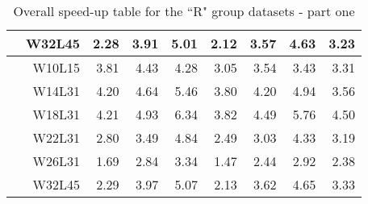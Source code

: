 \begin{table}[!ht]
\begin{tabular}{c r | rrr | rrrr}
		& W32L45 & 2.28 & 3.91 & 5.01 & 2.12 & 3.57 & 4.63 & 3.23 \\
		\midrule
		\multirow{6}{*}{\rotatebox[origin=c]{90}{\textbf{R500}}}
		& W10L15 & 3.81 & 4.43 & 4.28 & 3.05 & 3.54 & 3.43 & 3.31 \\
		& W14L31 & 4.20 & 4.64 & 5.46 & 3.80 & 4.20 & 4.94 & 3.56 \\
		& W18L31 & 4.21 & 4.93 & 6.34 & 3.82 & 4.49 & 5.76 & 4.50 \\
		& W22L31 & 2.80 & 3.49 & 4.84 & 2.49 & 3.03 & 4.33 & 3.19 \\
		& W26L31 & 1.69 & 2.84 & 3.34 & 1.47 & 2.44 & 2.92 & 2.38 \\
		& W32L45 & 2.29 & 3.97 & 5.07 & 2.13 & 3.62 & 4.65 & 3.33 \\
		\bottomrule
	\end{tabular}
	\caption{Overall speed-up table for the “R" group datasets - part one}
	\label{tab:speedup-gruppoR-pt1}
\end{table}
\clearpage

